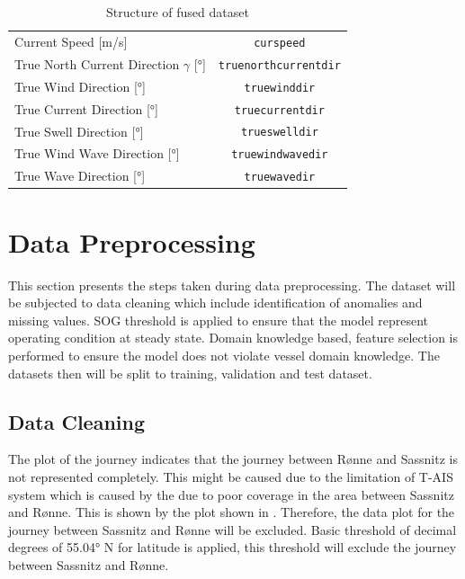 \begin{table}[ht]
{\begin{tabular}{ p{} c }
    Current Speed [m/s] & {\tt curspeed} \\
    True North Current Direction $\gamma$ [°] & {\tt truenorthcurrentdir}\\
    True Wind Direction [°] & {\tt truewinddir}  \\
    True Current Direction [°] & {\tt truecurrentdir} \\
    True Swell Direction [°] & {\tt trueswelldir} \\
    True Wind Wave Direction [°] & {\tt truewindwavedir} \\
    True Wave Direction [°] & {\tt truewavedir} \\
    \end{tabular}}
\caption{Structure of fused dataset}\label{tbl:dataset_init_struct}
\end{table}

\section{Data Preprocessing}\label{sec:data_prep}

This section presents the steps taken during data preprocessing. The dataset will be subjected to data cleaning which include identification of anomalies and missing values. SOG threshold is applied to ensure that the model represent operating condition at steady state. Domain knowledge based, feature selection is performed to ensure the model does not violate vessel domain knowledge. The datasets then will be split to training, validation and test dataset. 

\subsection{Data Cleaning}\label{sec:data_cleaning}

The plot of the journey indicates that the journey between R{\o}nne and Sassnitz is not represented completely. This might be caused due to the limitation of T-AIS system which is caused by the due to poor coverage in the area between Sassnitz and R{\o}nne. This is shown by the plot shown in . Therefore, the data plot for the journey between Sassnitz and R{\o}nne will be excluded. Basic threshold of decimal degrees of 55.04° N for latitude is applied, this threshold will exclude the journey between Sassnitz and R{\o}nne.\\

